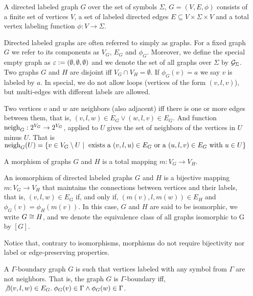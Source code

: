 \documentclass[runningheads]{llncs}
\begin{document}
\begin{definition}
	\label{def:graph}
	A directed labeled graph $G$ over the set of symbols $\Sigma$, $G = (V, E, \phi)$ consists of a finite set of vertices $V$, a set of labeled directed edges $E \subseteq V \times \Sigma \times V$ and a total vertex labeling function $\phi : V \to \Sigma$. 
\end{definition}

Directed labeled graphs are often referred to simply as graphs. For a fixed graph $G$ we refer to its components as $V_G$, $E_G$ and $\phi_G$. Moreover, we define the special empty graph as $\emptyGraph := (\emptyset, \emptyset, \emptyset)$ and we denote the set of all graphs over $\Sigma$ by $\allgraphs{\Sigma}$. Two graphs $G$ and $H$ are disjoint iff $V_G \cap V_H = \emptyset$. If $\phi_G(v) = a$ we say $v$ is labeled by $a$. In special, we do not allow loops (vertices of the form $(v,l,v)$), but multi-edges with different labels are allowed.

\begin{definition}
	Two vertices $v$ and $w$ are neighbors (also adjacent) iff there is one or more edges between them, that is, $(v,l,w) \in E_G \lor (w,l,v) \in E_G$. And function $\neigh{G}: 2^{V_G} \to 2^{V_G}$, applied to $U$ gives the set of neighbors of the vertices in $U$ minus $U$. That is $\neigh{G}(U) = \{ v \in V_G \setminus U \st \text{ exists a } (v,l,u) \in E_G \text{ or a } (u,l,v) \in E_G \text{ with } u \in U \}$
\end{definition}

\begin{definition}
	\label{def:morphism}
	A morphism of graphs $G$ and $H$ is a total mapping $m: V_G \to V_H$.
\end{definition}

\begin{definition}
	An isomorphism of directed labeled graphs $G$ and $H$ is a bijective mapping $m: V_G \to V_H$ that maintains the connections between vertices and their labels, that is, $(v,l,w) \in E_G$ if, and only if, $(m(v),l,m(w)) \in E_H$ and $\phi_G(v) = \phi_H(m(v))$. In this case, $G$ and $H$ are said to be isomorphic, we write $G \isomorph H$, and we denote the equivalence class of all graphs isomorphic to G by $[G]$.
\end{definition}

Notice that, contrary to isomorphisms, morphisms do not require bijectivity nor label or edge-preserving properties.

\begin{definition}
	A $\Gamma\text{-boundary}$ graph $G$ is such that vertices labeled with any symbol from $\Gamma$ are not neighbors. That is, the graph $G$ is $\Gamma\text{-boundary}$ iff, $\not\exists (v,l,w) \in E_G \. \phi_G(v) \in \Gamma \land \phi_G(w) \in \Gamma$.
\end{definition}
\end{document}
